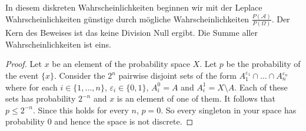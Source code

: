 \documentclass[11pt]{article}
\newcommand{\A}{\mathcal{A}}
\newcommand{\Om}{\Omega}
\newenvironment{reflection}[2][Reflection]{\begin{trivlist}
\item[\hskip \labelsep {\bfseries #1}\hskip \labelsep {\bfseries #2.}]}{\end{trivlist}}
\begin{document}
\begin{reflection}{1.1a}
In diesem diskreten Wahrscheinlichkeiten beginnen wir mit der Leplace Wahrscheinlichkeiten günstige durch mögliche Wahrscheinlichkeiten $ \frac{P(\A)}{P(\Om)}$. Der Kern des Beweises ist das keine Division Null ergibt. Die Summe aller Wahrscheinlichkeiten ist eins.
\end{reflection}
\begin{proof}
Let $x$ be an element of the probability space $X$.  Let $p$ be the probability of the event $\{x\}$.  Consider the $2^n$ pairwise disjoint sets of the form
$A_1^{\varepsilon_1}\cap\dots\cap A_n^{\varepsilon_n}$ where for each $i\in\{1,\dots,n\}$, $\varepsilon_i\in\{0,1\}$, $A_i^0=A$ and $A^1_i=X\setminus A$.
Each of these sets has probability $2^{-n}$ and $x$ is an element of one of them.
It follows that $p\leq 2^{-n}$.  Since this holds for every $n$, $p=0$.
So every singleton in your space has probability $0$ and hence the space is not discrete.
\end{proof}
\end{document}

